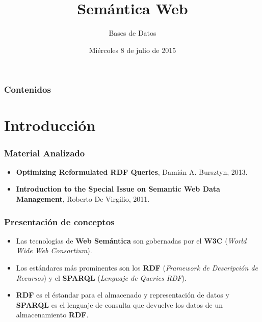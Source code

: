 \documentclass{beamer}
\title[Presentación del TP2]{Semántica Web} %
\author{Bases de Datos} %
\institute[] %
{
Federico Allocati, Sabrina Izcovich, Santiago Pernigotti, Germán Romano\\ %
\medskip
}
\date{Miércoles 8 de julio de 2015} %
\begin{document}
\begin{frame}
\titlepage %
\end{frame}

\begin{frame}
\frametitle{Contenidos} %
\tableofcontents %
\end{frame}


\section{Introducción} 
\begin{frame}
\frametitle{Material Analizado}
\begin{itemize}
\item \textbf{Optimizing Reformulated RDF Queries}, Damián A. Bursztyn, 2013.

\item \textbf{Introduction to the Special Issue on Semantic Web Data Management}, Roberto De Virgilio, 2011.
\end{itemize}
\end{frame}


\begin{frame}
\frametitle{Presentación de conceptos}
\begin{itemize}
\item Las tecnologías de \textbf{Web Semántica} son gobernadas por el \textbf{W3C} (\textit{World Wide Web Consortium}).

\item Los estándares más prominentes son los \textbf{RDF} (\textit{Framework de Descripción de Recursos}) y el \textbf{SPARQL} (\textit{Lenguaje de Queries RDF}).

\item \textbf{RDF} es el éstandar para el almacenado y representación de datos y \textbf{SPARQL} es el lenguaje de consulta que devuelve los datos de un almacenamiento \textbf{RDF}.
\end{itemize}
\end{frame}
\end{document}
